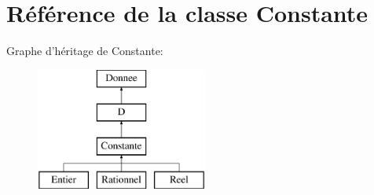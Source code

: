 \hypertarget{class_constante}{\section{Référence de la classe Constante}
\label{class_constante}
}
Graphe d'héritage de Constante\-:\begin{figure}[H]
\begin{center}
\leavevmode
\includegraphics[height=4.000000cm]{class_constante}
\end{center}
\end{figure}
